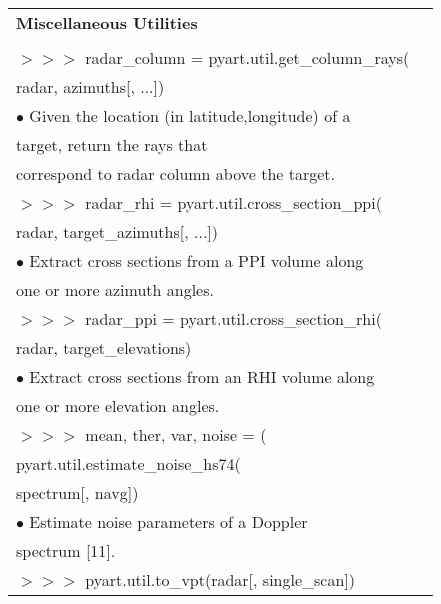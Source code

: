 \documentclass[potrait, z1paper, fontscale=0.33]{baposter} %
\begin{document}
\begin{poster}
{\begin{flushleft}
\begin{tabular}{@{}ll@{}}
\\
\multicolumn{2}{l}{\cellcolor[HTML]{DDFFFF}\bf Miscellaneous Utilities} \\
\\
$>$$>$$>$ radar\_column = pyart.util.get\_column\_rays(\\
\-\hspace{1.5cm} radar, azimuths[, ...])\\
\-\hspace{0.4cm} $\bullet$ Given the location (in latitude,longitude) of a\\
\-\hspace{0.7cm} target, return the rays that\\
\-\hspace{0.7cm} correspond to radar column above the target.\\
$>$$>$$>$ radar\_rhi = pyart.util.cross\_section\_ppi(\\
\-\hspace{1.5cm} radar, target\_azimuths[, ...])\\
\-\hspace{0.4cm} $\bullet$ Extract cross sections from a PPI volume along\\
\-\hspace{0.7cm} one or more azimuth angles.\\
$>$$>$$>$ radar\_ppi = pyart.util.cross\_section\_rhi(\\
\-\hspace{1.5cm} radar, target\_elevations)\\
\-\hspace{0.4cm} $\bullet$ 	Extract cross sections from an RHI volume along\\
\-\hspace{0.7cm} one or more elevation angles.\\
$>$$>$$>$ mean, ther, var, noise = (\\
\-\hspace{1.5cm} pyart.util.estimate\_noise\_hs74(\\
\-\hspace{3.0cm} spectrum[, navg])\\
\-\hspace{0.4cm} $\bullet$ Estimate noise parameters of a Doppler\\
\-\hspace{0.7cm} spectrum [11].\\
$>$$>$$>$ pyart.util.to\_vpt(radar[, single\_scan])\\

\end{tabular}
\end{flushleft}}
\end{poster}
\end{document}
